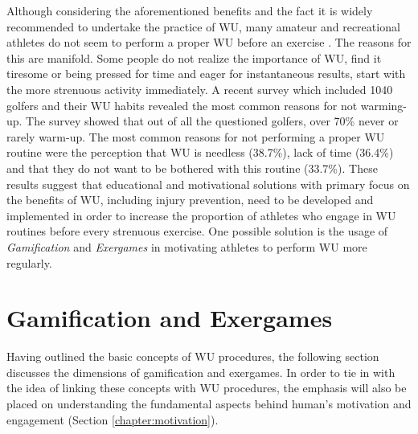 Although considering the aforementioned benefits and the fact it is widely recommended to undertake the practice of WU, many amateur and recreational athletes do not seem to perform a proper WU before an exercise \cite{fradkin2010effects}. The reasons for this are manifold. Some people do not realize the importance of WU, find it tiresome or being pressed for time and eager for instantaneous results, start with the more strenuous activity immediately. A recent survey \cite{fradkin2010effects} which included 1040 golfers and their WU habits revealed the most common reasons for not warming-up. The survey showed that out of all the questioned golfers, over 70\% never or rarely warm-up. The most common reasons for not performing a proper WU routine were the perception that WU is needless (38.7\%), lack of time (36.4\%) and that they do not want to be bothered with this routine (33.7\%). These results suggest that educational and motivational solutions with primary focus on the benefits of WU, including injury prevention, need to be developed and implemented in order to increase the proportion of athletes who engage in WU routines before every strenuous exercise. One possible solution is the usage of \textit{Gamification} and \textit{Exergames} in motivating athletes to perform WU more regularly. 
\pagebreak
\section{Gamification and Exergames}
Having outlined the basic concepts of WU procedures, the following section discusses the dimensions of gamification and exergames. In order to tie in with the idea of linking these concepts with WU procedures, the emphasis will also be placed on understanding the fundamental aspects behind human's motivation and engagement (Section \ref{chapter:motivation}). %
